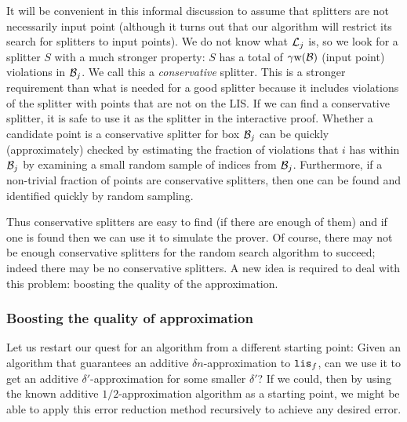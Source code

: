 \documentclass{acmsmall}
\newcommand{\cB}{{\cal B}}
\newcommand{\cL}{{\cal L}}
\newcommand{\lis}{{\tt lis}}
\newcommand{\width}{{\bf {\rm  w}}}
\begin{document}
It will be convenient in this informal discussion to assume that splitters are not necessarily input point (although it turns
out that our algorithm will restrict its search for splitters to input points).
We do not know what $\cL_j$ is, so we look for a splitter $S$ with
a much stronger property: $S$ has a total of $\gamma \width(\cB)$ (input point) violations in $\cB_j$.
We call this a {\em conservative} splitter.  This is a stronger requirement than what is needed for a good splitter because it includes
violations of the splitter with points that are not on the LIS.    If we can find a conservative splitter, it is safe to use it
as the splitter in the interactive proof.  Whether a candidate point is a conservative splitter for box $\cB_j$ can be quickly (approximately) checked by estimating
the fraction of violations that $i$ has within $\cB_j$ by examining a small random sample of
indices from $\cB_j$.    Furthermore, if a non-trivial fraction of points are 
conservative splitters, then one can be found and identified quickly by random sampling. 

Thus conservative splitters are easy to find (if there are enough of them)
and if one is found then we can use it to simulate the prover.  
Of course, there may not be enough conservative splitters for the random search algorithm to succeed; indeed there
may be no conservative splitters.   
A new idea is required to deal with this problem:
boosting the quality of the approximation.  
%

\subsubsection*{Boosting the quality of approximation}



Let us restart our quest for an algorithm from a different starting point:
Given an algorithm that guarantees an additive $\delta n$-approximation to $\lis_f$,
can we use it to get an additive $\delta'$-approximation for some
smaller $\delta'$?  If we could, then by using the known
additive $1/2$-approximation algorithm as a starting point,
we might be able to apply this error reduction method recursively to
achieve any desired error.
\end{document}
